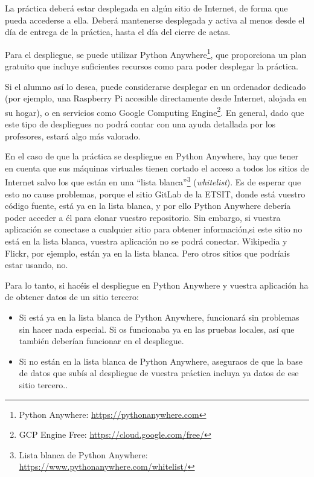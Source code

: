 La práctica deberá estar desplegada en algún sitio de Internet, de forma que pueda accederse a ella. Deberá mantenerse desplegada y activa al menos desde el día de entrega de la práctica, hasta el día del cierre de actas.

Para el despliegue, se puede utilizar Python Anywhere\footnote{Python Anywhere: \url{https://pythonanywhere.com}}, que proporciona un plan gratuito que incluye suficientes recursos como para poder desplegar la práctica.

Si el alumno así lo desea, puede considerarse desplegar en un ordenador dedicado (por ejemplo, una Raspberry Pi accesible directamente desde Internet, alojada en su hogar), o en servicios como Google Computing Engine\footnote{GCP Engine Free: \url{https://cloud.google.com/free/}}. En general, dado que este tipo de despliegues no podrá contar con una ayuda detallada por los profesores, estará algo más valorado.

En el caso de que la práctica se despliegue en Python Anywhere, hay que tener en cuenta que sus máquinas virtuales tienen cortado el acceso a todos los sitios de Internet salvo los que están en una ``lista blanca''\footnote{Lista blanca de Python Anywhere: \url{https://www.pythonanywhere.com/whitelist/}} (\emph{whitelist}). Es de esperar que esto no cause problemas, porque el sitio GitLab de la ETSIT, donde está vuestro código fuente, está ya en la lista blanca, y por ello Python Anywhere debería poder acceder a él para clonar vuestro repositorio. Sin embargo, si vuestra aplicación se conectase a cualquier sitio para obtener información,si este sitio no está en la lista blanca, vuestra aplicación no se podrá conectar. Wikipedia y Flickr, por ejemplo, están ya en la lista blanca. Pero otros sitios que podríais estar usando, no. 

Para lo tanto, si hacéis el despliegue en Python Anywhere y vuestra aplicación ha de obtener datos de un sitio tercero:

\begin{itemize}
  \item Si está ya en la lista blanca de Python Anywhere, funcionará sin problemas sin hacer nada especial. Si os funcionaba ya en las pruebas locales, así que también deberían funcionar en el despliegue.
  \item Si no están en la lista blanca de Python Anywhere, aseguraos de que la base de datos que subís al despliegue de vuestra práctica incluya ya datos de ese sitio tercero..
\end{itemize}

